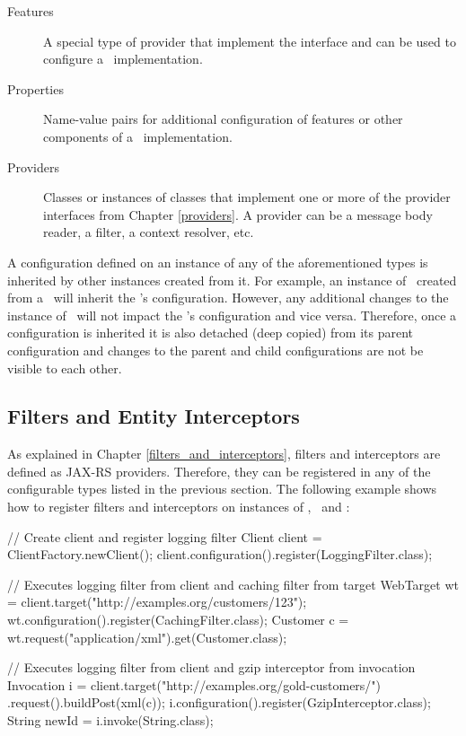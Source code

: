 \begin{description}
\item [Features] A special type of provider that implement the  interface and can be used to configure a \jaxrs\ implementation.
\item [Properties] Name-value pairs for additional configuration of features or other components of a \jaxrs\ implementation.
\item [Providers] Classes or instances of classes that implement one or more of the provider interfaces from Chapter \ref{providers}. A provider can be a message body reader, a filter, a context resolver, etc. 
\end{description}

A configuration defined on an instance of any of the aforementioned types is inherited by other instances created from it. For example, an instance of \WebTarget\ created from a \Client\ will inherit the \Client's configuration. However, any additional changes to the instance of \WebTarget\ will not impact the \Client's configuration and vice versa. Therefore, once a configuration is inherited it is also detached (deep copied) from its parent configuration and changes to the parent and child configurations are not be visible to each other.

\subsection{Filters and Entity Interceptors}
\label{filters_interceptors_client}

As explained in Chapter \ref{filters_and_interceptors}, filters and interceptors are defined as JAX-RS providers. Therefore, they can be registered in any of the configurable types listed in the previous section. The following example shows how to register filters and interceptors on instances of \Client, \WebTarget\ and \Invocation:

\begin{listing}{1}
// Create client and register logging filter
Client client = ClientFactory.newClient();
client.configuration().register(LoggingFilter.class);

// Executes logging filter from client and caching filter from target
WebTarget wt = client.target("http://examples.org/customers/123");
wt.configuration().register(CachingFilter.class);
Customer c = wt.request("application/xml").get(Customer.class);

// Executes logging filter from client and gzip interceptor from invocation
Invocation i = client.target("http://examples.org/gold-customers/")
    .request().buildPost(xml(c));
i.configuration().register(GzipInterceptor.class);
String newId = i.invoke(String.class);
\end{listing}

